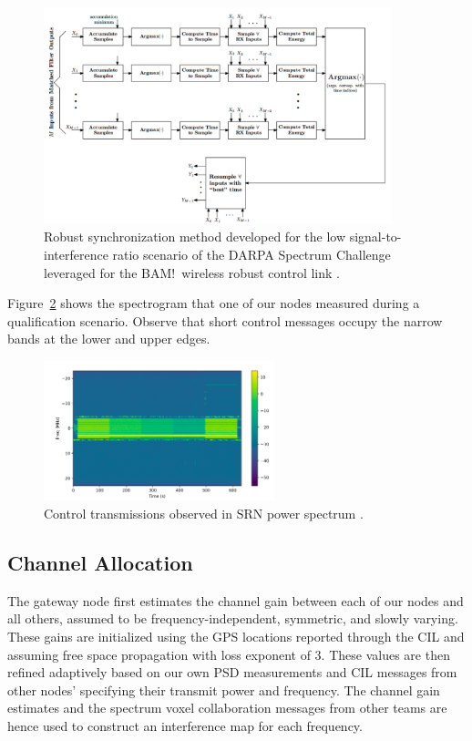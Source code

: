 \documentclass[11pt]{article}
\begin{document}
\begin{figure} [htb]
     \centerline{
     \includegraphics[width = 0.9\textwidth]{Figures/NDASync.png}}
     \caption{Robust synchronization method developed for the low signal-to-interference ratio scenario of the DARPA Spectrum Challenge leveraged for the BAM!\ wireless robust control link \cite[Figure $4$]{func-report}.}
     \label{fig:shortcontrol}
     \end{figure}
     
Figure~\ref{fig:controlband} shows the spectrogram that one of our nodes measured during a qualification scenario. Observe that short control messages occupy the narrow bands at the lower and upper edges. 

\begin{figure} [htb]
     \centerline{
     \includegraphics[width = 0.6\textwidth]{Figures/CCEx.png}}
     \caption{Control transmissions observed in SRN power spectrum \cite[Figure $5$]{func-report}.}
     \label{fig:controlband}
     \end{figure}
     
\subsection{Channel Allocation}
\label{s-chan_alloc}

The
gateway node first estimates the channel gain between each of our nodes and all others, assumed to be frequency-independent, symmetric, and slowly varying. These gains are initialized using the GPS locations reported through the CIL and assuming free space propagation with loss exponent of 3. These values are then refined adaptively based on our own PSD measurements and CIL messages from other nodes' specifying their transmit power and frequency. The channel gain estimates and the spectrum voxel collaboration messages from other teams are
hence used to construct an interference map for each frequency. 
\end{document}
